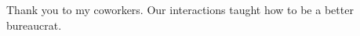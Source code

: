 \thispagestyle{empty}

Thank you to my coworkers. Our interactions taught how to be a better bureaucrat.
